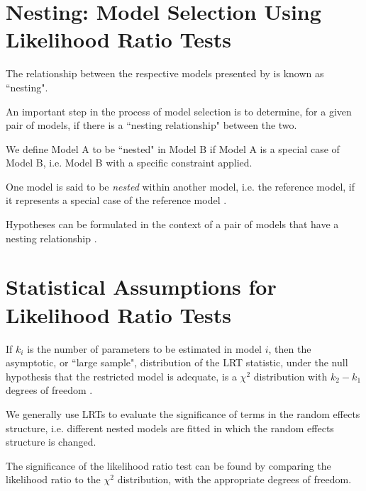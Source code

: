\documentclass[12pt, a4paper]{report}
\theoremstyle{plain}
\theoremstyle{definition}
\theoremstyle{remark}
\begin{document}
\section{Nesting: Model Selection Using Likelihood Ratio Tests}
The relationship between the respective models presented by \citet{roy} is known as ``nesting".

An important step in the process of model selection is to determine, for a given pair of models, if there is a ``nesting relationship" between the two.

We define Model A to be ``nested" in Model B if Model A is a special case of Model B, i.e. Model B with a specific constraint applied.

One model is said to be \emph{nested} within another model, i.e. the reference model, if it represents a special case of the reference model \citep{PB}.

Hypotheses can be formulated in the context of a pair of models that have a nesting relationship \citet{west}.






%
%



\section{Statistical Assumptions for Likelihood Ratio Tests}


If $k_i$ is the number of parameters to be estimated in model $i$, then the asymptotic, or ``large sample", distribution of the LRT statistic, under the null hypothesis that the restricted model is adequate, is a $\chi^2$ distribution with $k_2-k_1$ degrees of freedom \citep[pg.83]{pb}.

We generally use LRTs to evaluate the significance of terms in the random effects structure, i.e. different nested models are fitted in which the random effects structure is changed.

The significance of the likelihood ratio test can be found by comparing the likelihood ratio to the $\chi^2$ distribution, with the appropriate degrees of freedom.
\end{document}
